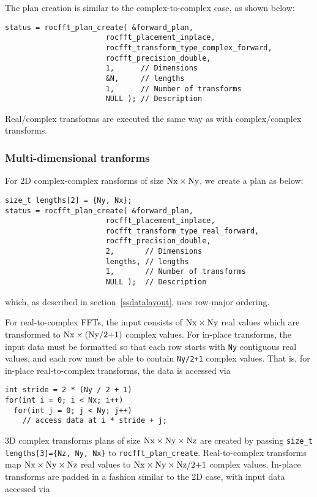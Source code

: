 \documentclass[10pt]{article}
\renewcommand{\(}{\left(}
\renewcommand{\)}{\right)}
\begin{document}
The plan creation is similar to the complex-to-complex case, as shown
below:
\begin{lstlisting}
status = rocfft_plan_create( &forward_plan,
                       rocfft_placement_inplace,
                       rocfft_transform_type_complex_forward,
                       rocfft_precision_double,
                       1,      // Dimensions
                       &N,     // lengths
                       1,      // Number of transforms
                       NULL ); // Description
\end{lstlisting}
Real/complex transforms are executed the same way as with
complex/complex transforms.

\subsubsection{Multi-dimensional tranforms}

For 2D complex-complex ransforms of size
$\text{\lstinline{Nx}}\times\text{\lstinline{Ny}}$, we create a plan
as below:
\begin{lstlisting}
size_t lengths[2] = {Ny, Nx};
status = rocfft_plan_create( &forward_plan,
                       rocfft_placement_inplace,
                       rocfft_transform_type_real_forward,
                       rocfft_precision_double,
                       2,       // Dimensions
                       lengths, // lengths
                       1,       // Number of transforms
                       NULL );  // Description
\end{lstlisting}
which, as described in section~\ref{ssdatalayout}, uses row-major
ordering.

For real-to-complex FFTs, the input consists of
$\text{\lstinline{Nx}}\times\text{\lstinline{Ny}}$ real values which
are transformed to
$\text{\lstinline{Nx}}\times(\text{\lstinline{Ny/2+1}})$ complex
values.  For in-place transforms, the input data must be formatted so
that each row starts with \lstinline{Ny} contiguous real values, and
each row must be able to contain \lstinline{Ny/2+1} complex values.
That is, for in-place real-to-complex transforms, the data is accessed
via
\begin{lstlisting}
int stride = 2 * (Ny / 2 + 1)
for(int i = 0; i < Nx; i++)
  for(int j = 0; j < Ny; j++)
    // access data at i * stride + j;
\end{lstlisting}

3D complex transforms plans of size
$\text{\lstinline{Nx}}\times\text{\lstinline{Ny}}\times\text{\lstinline{Nz}}$
are created by passing \lstinline|size_t lengths[3]={Nz, Ny, Nx}| to
\lstinline{rocfft_plan_create}.  Real-to-complex transforms map
$\text{\lstinline{Nx}}\times\text{\lstinline{Ny}}\times\text{\lstinline{Nz}}$
real values to
$\text{\lstinline{Nx}}\times\text{\lstinline{Ny}}\times\text{\lstinline{Nz/2+1}}$
complex values.  In-place transforms are padded in a fashion similar
to the 2D case, with input data accessed via
\end{document}
